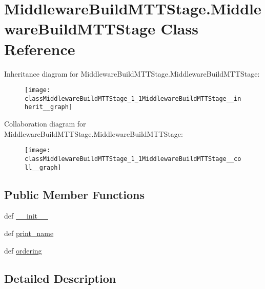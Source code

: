 \hypertarget{classMiddlewareBuildMTTStage_1_1MiddlewareBuildMTTStage}{\section{Middleware\-Build\-M\-T\-T\-Stage.\-Middleware\-Build\-M\-T\-T\-Stage Class Reference}
\label{classMiddlewareBuildMTTStage_1_1MiddlewareBuildMTTStage}
}


Inheritance diagram for Middleware\-Build\-M\-T\-T\-Stage.\-Middleware\-Build\-M\-T\-T\-Stage\-:\nopagebreak
\begin{figure}[H]
\begin{center}
\leavevmode
\texttt{[image: classMiddlewareBuildMTTStage\_1\_1MiddlewareBuildMTTStage\_\_inherit\_\_graph]}
\end{center}
\end{figure}


Collaboration diagram for Middleware\-Build\-M\-T\-T\-Stage.\-Middleware\-Build\-M\-T\-T\-Stage\-:\nopagebreak
\begin{figure}[H]
\begin{center}
\leavevmode
\texttt{[image: classMiddlewareBuildMTTStage\_1\_1MiddlewareBuildMTTStage\_\_coll\_\_graph]}
\end{center}
\end{figure}
\subsection*{Public Member Functions}
\begin{DoxyCompactItemize}
\item 
def \hyperlink{classMiddlewareBuildMTTStage_1_1MiddlewareBuildMTTStage_a0c5703a5b7e75be6f0f63aed3a05e26a}{\-\_\-\-\_\-init\-\_\-\-\_\-}
\item 
def \hyperlink{classMiddlewareBuildMTTStage_1_1MiddlewareBuildMTTStage_ada1faf2bdde78b57f7a72eb5721ef227}{print\-\_\-name}
\item 
def \hyperlink{classMiddlewareBuildMTTStage_1_1MiddlewareBuildMTTStage_af9955c5ba7cdf15e50dc5a6fd23c4e36}{ordering}
\end{DoxyCompactItemize}


\subsection{Detailed Description}


